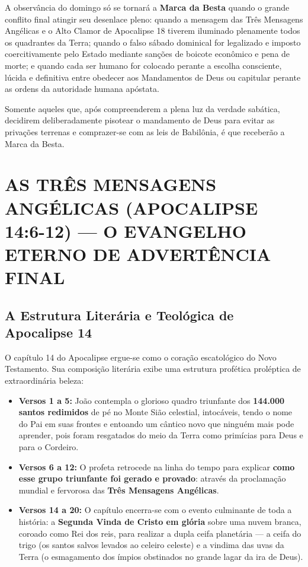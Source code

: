\documentclass[11pt,a4paper,openany]{book}
\begin{document}
A observância do domingo só se tornará a \textbf{Marca da Besta} quando o grande conflito final atingir seu desenlace pleno: quando a mensagem das Três Mensagens Angélicas e o Alto Clamor de Apocalipse 18 tiverem iluminado plenamente todos os quadrantes da Terra; quando o falso sábado dominical for legalizado e imposto coercitivamente pelo Estado mediante sanções de boicote econômico e pena de morte; e quando cada ser humano for colocado perante a escolha consciente, lúcida e definitiva entre obedecer aos Mandamentos de Deus ou capitular perante as ordens da autoridade humana apóstata.

Somente aqueles que, após compreenderem a plena luz da verdade sabática, decidirem deliberadamente pisotear o mandamento de Deus para evitar as privações terrenas e comprazer-se com as leis de Babilônia, é que receberão a Marca da Besta.



\section{AS TRÊS MENSAGENS ANGÉLICAS (APOCALIPSE 14:6-12) — O EVANGELHO ETERNO DE ADVERTÊNCIA FINAL}



\subsection{A Estrutura Literária e Teológica de Apocalipse 14}


O capítulo 14 do Apocalipse ergue-se como o coração escatológico do Novo Testamento. Sua composição literária exibe uma estrutura profética proléptica de extraordinária beleza:

\begin{itemize}
  \item \textbf{Versos 1 a 5:} João contempla o glorioso quadro triunfante dos \textbf{144.000 santos redimidos} de pé no Monte Sião celestial, intocáveis, tendo o nome do Pai em suas frontes e entoando um cântico novo que ninguém mais pode aprender, pois foram resgatados do meio da Terra como primícias para Deus e para o Cordeiro.
  \item \textbf{Versos 6 a 12:} O profeta retrocede na linha do tempo para explicar \textbf{como esse grupo triunfante foi gerado e provado}: através da proclamação mundial e fervorosa das \textbf{Três Mensagens Angélicas}.
  \item \textbf{Versos 14 a 20:} O capítulo encerra-se com o evento culminante de toda a história: a \textbf{Segunda Vinda de Cristo em glória} sobre uma nuvem branca, coroado como Rei dos reis, para realizar a dupla ceifa planetária — a ceifa do trigo (os santos salvos levados ao celeiro celeste) e a vindima das uvas da Terra (o esmagamento dos ímpios obstinados no grande lagar da ira de Deus).
\end{itemize}
\end{document}
